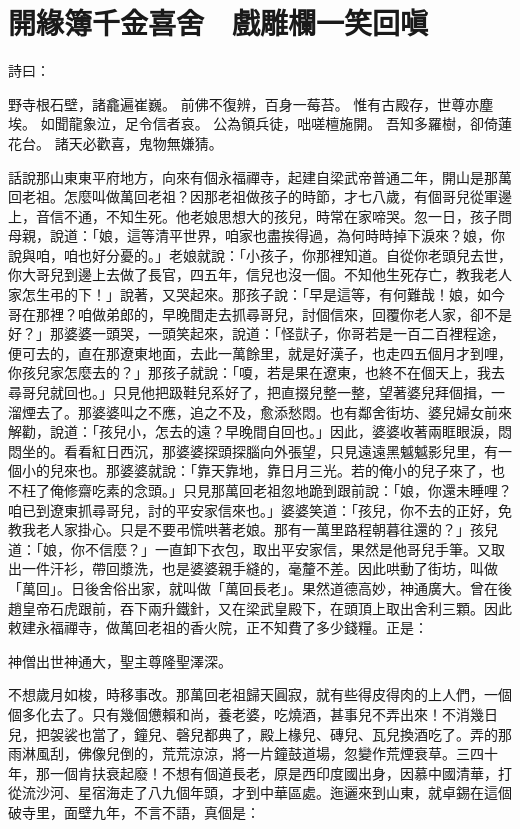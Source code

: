 %

\chapter{開緣簿千金喜舍　戲雕欄一笑回嗔}

詩曰：

野寺根石壁，諸龕遍崔巍。
前佛不復辨，百身一莓苔。
惟有古殿存，世尊亦塵埃。
如聞龍象泣，足令信者哀。
公為領兵徒，咄嗟檀施開。
吾知多羅樹，卻倚蓮花台。
諸天必歡喜，鬼物無嫌猜。

話說那山東東平府地方，向來有個永福禪寺，起建自梁武帝普通二年，開山是那萬回老祖。怎麼叫做萬回老祖？因那老祖做孩子的時節，才七八歲，有個哥兒從軍邊上，音信不通，不知生死。他老娘思想大的孩兒，時常在家啼哭。忽一日，孩子問母親，說道：「娘，這等清平世界，咱家也盡挨得過，為何時時掉下淚來？娘，你說與咱，咱也好分憂的。」老娘就說：「小孩子，你那裡知道。自從你老頭兒去世，你大哥兒到邊上去做了長官，四五年，信兒也沒一個。不知他生死存亡，教我老人家怎生弔的下！」說著，又哭起來。那孩子說：「早是這等，有何難哉！娘，如今哥在那裡？咱做弟郎的，早晚間走去抓尋哥兒，討個信來，回覆你老人家，卻不是好？」那婆婆一頭哭，一頭笑起來，說道：「怪獃子，你哥若是一百二百裡程途，便可去的，直在那遼東地面，去此一萬餘里，就是好漢子，也走四五個月才到哩，你孩兒家怎麼去的？」那孩子就說：「嗄，若是果在遼東，也終不在個天上，我去尋哥兒就回也。」只見他把趿鞋兒系好了，把直掇兒整一整，望著婆兒拜個揖，一溜煙去了。那婆婆叫之不應，追之不及，愈添愁悶。也有鄰舍街坊、婆兒婦女前來解勸，說道：「孩兒小，怎去的遠？早晚間自回也。」因此，婆婆收著兩眶眼淚，悶悶坐的。看看紅日西沉，那婆婆探頭探腦向外張望，只見遠遠黑魆魆影兒里，有一個小的兒來也。那婆婆就說：「靠天靠地，靠日月三光。若的俺小的兒子來了，也不枉了俺修齋吃素的念頭。」只見那萬回老祖忽地跪到跟前說：「娘，你還未睡哩？咱已到遼東抓尋哥兒，討的平安家信來也。」婆婆笑道：「孩兒，你不去的正好，免教我老人家掛心。只是不要弔慌哄著老娘。那有一萬里路程朝暮往還的？」孩兒道：「娘，你不信麼？」一直卸下衣包，取出平安家信，果然是他哥兒手筆。又取出一件汗衫，帶回漿洗，也是婆婆親手縫的，毫釐不差。因此哄動了街坊，叫做「萬回」。日後舍俗出家，就叫做「萬回長老」。果然道德高妙，神通廣大。曾在後趙皇帝石虎跟前，吞下兩升鐵針，又在梁武皇殿下，在頭頂上取出舍利三顆。因此敕建永福禪寺，做萬回老祖的香火院，正不知費了多少錢糧。正是：

神僧出世神通大，聖主尊隆聖澤深。

不想歲月如梭，時移事改。那萬回老祖歸天圓寂，就有些得皮得肉的上人們，一個個多化去了。只有幾個憊賴和尚，養老婆，吃燒酒，甚事兒不弄出來！不消幾日兒，把袈裟也當了，鐘兒、磬兒都典了，殿上椽兒、磚兒、瓦兒換酒吃了。弄的那雨淋風刮，佛像兒倒的，荒荒涼涼，將一片鐘鼓道場，忽變作荒煙衰草。三四十年，那一個肯扶衰起廢！不想有個道長老，原是西印度國出身，因慕中國清華，打從流沙河、星宿海走了八九個年頭，才到中華區處。迤邐來到山東，就卓錫在這個破寺里，面壁九年，不言不語，真個是：

